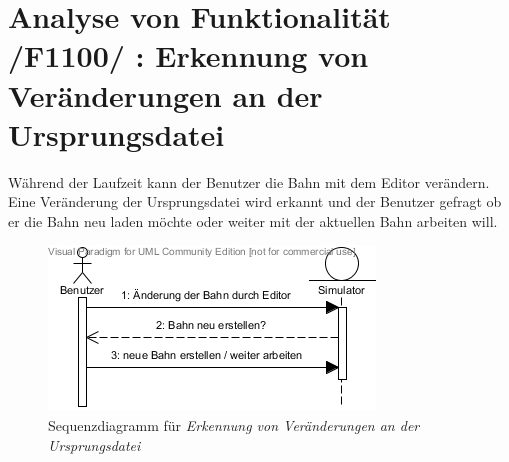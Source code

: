 \section{Analyse von Funktionalität /F1100/ :  Erkennung von Veränderungen an der Ursprungsdatei}
Während der Laufzeit kann der Benutzer die Bahn mit dem Editor verändern.
Eine Veränderung der Ursprungsdatei wird erkannt und der Benutzer gefragt ob er die Bahn neu laden möchte oder weiter mit der aktuellen Bahn arbeiten will.

\begin{figure}[h!]
\includegraphics[width=\linewidth]{bilder/change_headdata}
\caption{Sequenzdiagramm für \textit{Erkennung von Veränderungen an der Ursprungsdatei}}
\end{figure}

